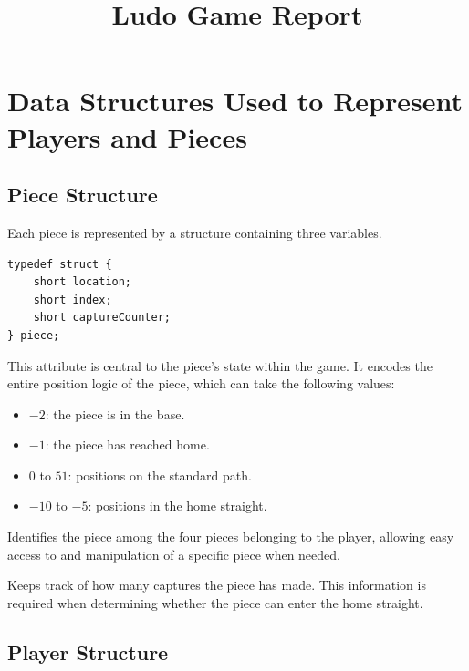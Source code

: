 \documentclass[11pt,a4paper]{article}
\title{\textbf{Ludo Game Report}}
\author{}
\date{}
\newcommand{\code}[1]{\texttt{#1}}
\begin{document}
\maketitle

\section{Data Structures Used to Represent Players and Pieces}

\subsection{Piece Structure}

Each piece is represented by a structure containing three variables.

\begin{lstlisting}
typedef struct {
    short location;
    short index;
    short captureCounter;
} piece;
\end{lstlisting}

\begin{description}[style=nextline, leftmargin=1.5em]
  \item[\code{location}]
    This attribute is central to the piece's state within the game. It encodes
    the entire position logic of the piece, which can take the following values:
    \begin{itemize}[nosep]
      \item $-2$: the piece is in the base.
      \item $-1$: the piece has reached home.
      \item $0$ to $51$: positions on the standard path.
      \item $-10$ to $-5$: positions in the home straight.
    \end{itemize}

  \item[\code{index}]
    Identifies the piece among the four pieces belonging to the player, allowing
    easy access to and manipulation of a specific piece when needed.

  \item[\code{captureCounter}]
    Keeps track of how many captures the piece has made. This information is
    required when determining whether the piece can enter the home straight.
\end{description}

\subsection{Player Structure}
\end{document}
